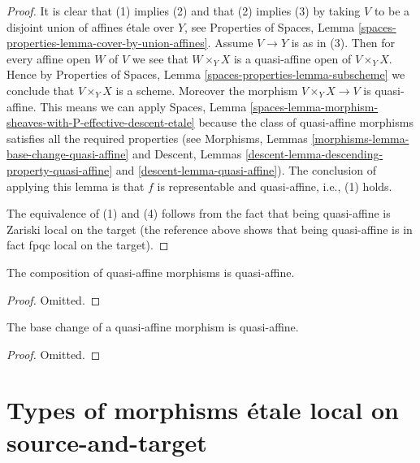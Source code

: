 \begin{proof}
It is clear that (1) implies (2) and that (2) implies (3) by taking
$V$ to be a disjoint union of affines \'etale over $Y$, see
Properties of Spaces,
Lemma \ref{spaces-properties-lemma-cover-by-union-affines}.
Assume $V \to Y$ is as in (3). Then for every affine open $W$ of $V$ we see
that $W \times_Y X$ is a quasi-affine open of $V \times_Y X$. Hence by
Properties of Spaces, Lemma \ref{spaces-properties-lemma-subscheme}
we conclude that $V \times_Y X$ is a scheme. Moreover the morphism
$V \times_Y X \to V$ is quasi-affine. This means we can apply
Spaces,
Lemma \ref{spaces-lemma-morphism-sheaves-with-P-effective-descent-etale}
because the class of quasi-affine morphisms satisfies all the required
properties (see
Morphisms, Lemmas \ref{morphisms-lemma-base-change-quasi-affine} and
Descent, Lemmas \ref{descent-lemma-descending-property-quasi-affine}
and \ref{descent-lemma-quasi-affine}). The conclusion of applying this lemma
is that $f$ is representable and quasi-affine, i.e., (1) holds.

\medskip\noindent
The equivalence of (1) and (4) follows from the fact that being
quasi-affine is Zariski local on the target (the reference above shows
that being quasi-affine is in fact fpqc local on the target).
\end{proof}

\begin{lemma}
\label{lemma-composition-quasi-affine}
The composition of quasi-affine morphisms is quasi-affine.
\end{lemma}

\begin{proof}
Omitted.
\end{proof}

\begin{lemma}
\label{lemma-base-change-quasi-affine}
The base change of a quasi-affine morphism is quasi-affine.
\end{lemma}

\begin{proof}
Omitted.
\end{proof}








\section{Types of morphisms \'etale local on source-and-target}
\label{section-local-source-target}

